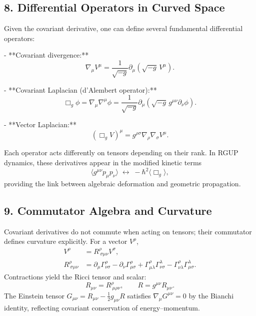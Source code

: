 \documentclass[11pt,oneside]{book}
\numberwithin{equation}{chapter}
\begin{document}
\subsection*{8. Differential Operators in Curved Space}

Given the covariant derivative, one can define several fundamental differential operators:

- **Covariant divergence:**
\begin{equation}
\nabla_\mu V^\mu = \frac{1}{\sqrt{-g}}\partial_\mu(\sqrt{-g}\,V^\mu).
\end{equation}

- **Covariant Laplacian (d’Alembert operator):**
\begin{equation}
\Box_g \phi = \nabla_\mu\nabla^\mu \phi
= \frac{1}{\sqrt{-g}}
\partial_\mu(\sqrt{-g}\,g^{\mu\nu}\partial_\nu \phi).
\end{equation}

- **Vector Laplacian:**
\begin{equation}
(\Box_g V)^\mu = g^{\rho\sigma}\nabla_\rho\nabla_\sigma V^\mu.
\end{equation}

Each operator acts differently on tensors depending on their rank.  
In RGUP dynamics, these derivatives appear in the modified kinetic terms
\begin{equation}
\langle g^{\mu\nu}p_\mu p_\nu\rangle
\;\leftrightarrow\;
-\hbar^2 \langle \Box_g \rangle,
\end{equation}
providing the link between algebraic deformation and geometric propagation.

\subsection*{9. Commutator Algebra and Curvature}

Covariant derivatives do not commute when acting on tensors; their commutator defines curvature explicitly.  
For a vector $V^\rho$,
\begin{align}
[\nabla_\mu,\nabla_\nu]V^\rho
&= R^\rho_{\ \sigma\mu\nu}V^\sigma, \\
R^\rho_{\ \sigma\mu\nu}
&= \partial_\mu \Gamma^\rho_{\nu\sigma}
- \partial_\nu \Gamma^\rho_{\mu\sigma}
+ \Gamma^\rho_{\mu\lambda}\Gamma^\lambda_{\nu\sigma}
- \Gamma^\rho_{\nu\lambda}\Gamma^\lambda_{\mu\sigma}.
\end{align}
Contractions yield the Ricci tensor and scalar:
\begin{equation}
R_{\mu\nu} = R^\rho_{\ \mu\rho\nu},
\qquad
R = g^{\mu\nu}R_{\mu\nu}.
\end{equation}
The Einstein tensor $G_{\mu\nu}=R_{\mu\nu}-\tfrac{1}{2}g_{\mu\nu}R$ satisfies $\nabla_\mu G^{\mu\nu}=0$ by the Bianchi identity, reflecting covariant conservation of energy–momentum.
\end{document}
